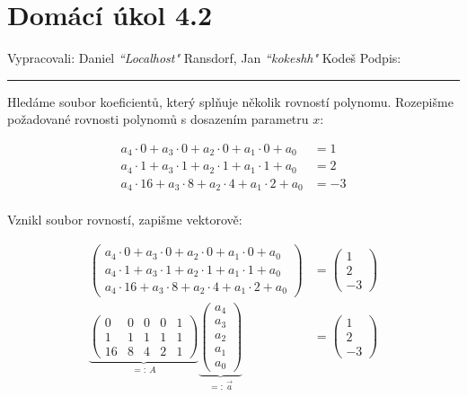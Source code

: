 \documentclass[12pt]{article}
\begin{document}
\section*{Domácí úkol 4.2}

Vypracovali: Daniel \textit{``Localhost"} Ransdorf, Jan \textit{``kokeshh"} Kodeš \hfill Podpis: \rule{4cm}{0.4pt}


\bigskip

Hledáme soubor koeficientů, který splňuje několik rovností polynomu.
Rozepišme požadované rovnosti polynomů s dosazením parametru $x$:

\begin{align*}
  a_4\cdot0 + a_3\cdot0 + a_2\cdot0 + a_1\cdot0 + a_0 &= 1 \\
  a_4\cdot1 + a_3\cdot1 + a_2\cdot1 + a_1\cdot1 + a_0 &= 2 \\
  a_4\cdot16 + a_3\cdot8 + a_2\cdot4 + a_1\cdot2 + a_0 &= -3 \\
\end{align*}

Vznikl soubor rovností, zapišme vektorově:

\begin{align*}
  \left(\begin{array}{c}
    a_4\cdot0 + a_3\cdot0 + a_2\cdot0 + a_1\cdot0 + a_0 \\
    a_4\cdot1 + a_3\cdot1 + a_2\cdot1 + a_1\cdot1 + a_0 \\
    a_4\cdot16 + a_3\cdot8 + a_2\cdot4 + a_1\cdot2 + a_0
  \end{array}\right)
  &= \left(\begin{array}{c}
    1 \\
    2 \\
    -3
  \end{array}\right) \\
  \underbrace{\left(\begin{array}{ccccc}
    0&0&0&0&1 \\
    1&1&1&1&1 \\
    16&8&4&2&1
  \end{array}\right)}_{=:\ A} \underbrace{\left(\begin{array}{c}
    a_4 \\ a_3 \\ a_2 \\ a_1 \\ a_0
  \end{array}\right)}_{=:\ \vec{a}}
  &= \left(\begin{array}{c}
    1 \\
    2 \\
    -3
  \end{array}\right)
\end{align*}
\end{document}
